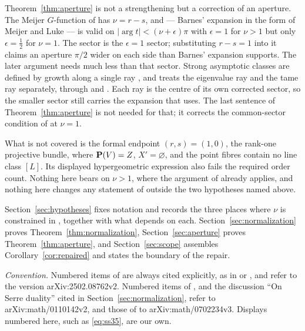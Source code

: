 Theorem~\ref{thm:aperture} is not a strengthening but a correction of an
aperture.  The Meijer \(G\)-function of \cite[Lemma~7.4]{SS} has
\(\nu=r-s\), and \cite[Theorem~A.1]{SS} --- Barnes' expansion in the form
of Meijer \cite{Meijer} and Luke \cite{Luke} --- is valid on
\(|\arg t|<(\nu+\epsilon)\pi\) with \(\epsilon=1\) for \(\nu>1\) but only
\(\epsilon=\tfrac12\) for \(\nu=1\).  The sector \cite[(64)]{SS} is the
\(\epsilon=1\) sector; substituting \(r-s=1\) into it claims an aperture
\(\pi/2\) wider on each side than Barnes' expansion supports.  The later
argument needs much less than that sector.  Strong asymptotic classes are
defined by growth along a single ray \cite[Definition~1.3]{SS}, and
\cite[Proposition~9.2]{SS} treats the eigenvalue ray and the tame ray
separately, through \cite[Proposition~7.8]{SS} and
\cite[Corollary~8.4]{SS}.  Each ray is the centre of its own corrected
sector, so the smaller sector still carries the expansion that
\cite[Section~9]{SS} uses.  The last sentence of
Theorem~\ref{thm:aperture} is not needed for that; it corrects the
common-sector condition of \cite[Remark~1.6]{SS} at \(\nu=1\).

What is not covered is the formal endpoint \((r,s)=(1,0)\), the rank-one
projective bundle, where \(\mathbf P(V)=Z\), \(X'=\varnothing\), and the point
fibres contain no line class \([L]\).  Its displayed hypergeometric expression
also fails the required order count.  Nothing here bears on \(\nu>1\), where
the argument of \cite{SS} already applies, and nothing here changes any
statement of \cite{SS} outside the two hypotheses named above.

Section~\ref{sec:hypotheses} fixes notation and records the three places
where \(\nu\) is constrained in \cite{SS}, together with what depends on
each.  Section~\ref{sec:normalization} proves
Theorem~\ref{thm:normalization}, Section~\ref{sec:aperture} proves
Theorem~\ref{thm:aperture}, and Section~\ref{sec:scope} assembles
Corollary~\ref{cor:repaired} and states the boundary of the repair.

\medskip
\noindent\emph{Convention.}  Numbered items of \cite{SS} are always cited
explicitly, as in \cite[Theorem~4.4]{SS} or \cite[(35)]{SS}, and refer to
the version arXiv:2502.08762v2.  Numbered items of \cite{CoatesGivental},
and the discussion ``On Serre duality'' cited in
Section~\ref{sec:normalization}, refer to arXiv:math/0110142v2, and those of
\cite{CCIT} to arXiv:math/0702234v3.  Displays numbered here, such as
\eqref{eq:ss35}, are our own.
